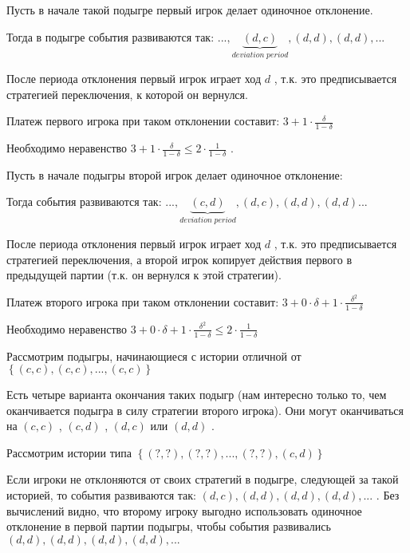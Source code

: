 \documentclass[pdftex,12pt,a4paper]{article}
\begin{document}
Пусть в начале такой подыгре первый игрок делает одиночное отклонение.

Тогда в подыгре события развиваются так:  $...,\underbrace{\left(d,c\right)}_{deviation\; period},\left(d,d\right),\left(d,d\right),...$

После периода отклонения первый игрок играет ход  $d$ , т.к. это предписывается стратегией переключения, к которой он вернулся.

Платеж первого игрока при таком отклонении составит:  $3+1\cdot \frac{\delta }{1-\delta } $

Необходимо неравенство  $3+1\cdot \frac{\delta }{1-\delta } \le 2\cdot \frac{1}{1-\delta } $ .

Пусть в начале подыгры второй игрок делает одиночное отклонение:

Тогда события развиваются так:  $...,\underbrace{\left(c,d\right)}_{deviation\; period},\left(d,c\right),\left(d,d\right),\left(d,d\right)...$

После периода отклонения первый игрок играет ход  $d$ , т.к. это предписывается стратегией переключения, а второй игрок копирует действия первого в предыдущей партии (т.к. он вернулся к этой стратегии).

Платеж второго игрока при таком отклонении составит:  $3+0\cdot \delta +1\cdot \frac{\delta ^{2} }{1-\delta } $

Необходимо неравенство  $3+0\cdot \delta +1\cdot \frac{\delta ^{2} }{1-\delta } \le 2\cdot \frac{1}{1-\delta } $

Рассмотрим подыгры, начинающиеся с истории отличной от  $\left\{\left(c,c\right),\left(c,c\right),...,\left(c,c\right)\right\}$

Есть четыре варианта окончания таких подыгр (нам интересно только то, чем оканчивается подыгра в силу стратегии второго игрока). Они могут оканчиваться на  $\left(c,c\right)$ ,  $\left(c,d\right)$ ,  $\left(d,c\right)$  или  $\left(d,d\right)$ .

Рассмотрим истории типа  $\left\{\left(?,?\right),\left(?,?\right),...,\left(?,?\right),\left(c,d\right)\right\}$

Если игроки не отклоняются от своих стратегий в подыгре, следующей за такой историей, то события развиваются так:  $\left(d,c\right),\left(d,d\right),\left(d,d\right),\left(d,d\right),...$ . Без вычислений видно, что второму игроку выгодно использовать одиночное отклонение в первой партии подыгры, чтобы события развивались  $\left(d,d\right),\left(d,d\right),\left(d,d\right),\left(d,d\right),...$
\end{document}
